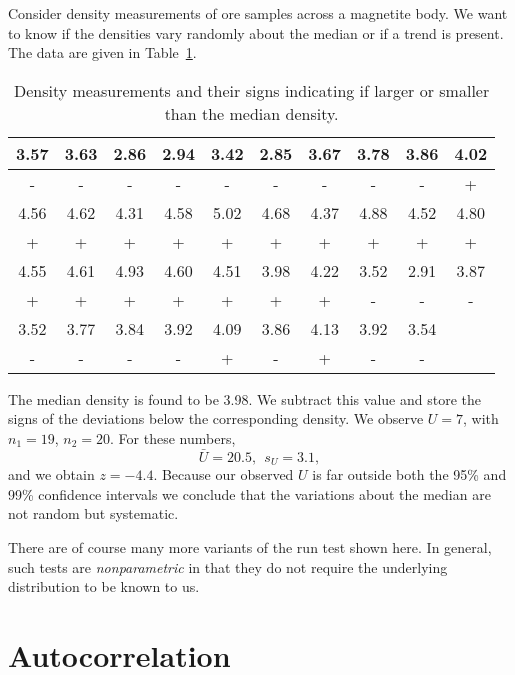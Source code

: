 \begin{example}
Consider density measurements of ore samples across a magnetite body.  We 
want to know if the densities vary randomly about the median or if a trend is present.  The data 
are given in Table~\ref{tbl:runtest}.
\begin{table}[h]
\center
\begin{tabular}{|c|c|c|c|c|c|c|c|c|c|} \hline
3.57 & 3.63 & 2.86 & 2.94 & 3.42 & 2.85 & 3.67 & 3.78 & 3.86 & 4.02 \\ \hline
 -   &  -   &  -   &  -   &  -   &  -   &  -   &  -   &  -   &  +   \\ \hline
4.56 & 4.62 & 4.31 & 4.58 & 5.02 & 4.68 & 4.37 & 4.88 & 4.52 & 4.80 \\ \hline
 +   &  +   &  +   &  +   &  +   &  +   &  +   &  +   &  +   &  +   \\ \hline
4.55 & 4.61 & 4.93 & 4.60 & 4.51 & 3.98 & 4.22 & 3.52 & 2.91 & 3.87 \\ \hline
 +   &  +   &  +   &  +   &  +   &  +   &  +   &  -   &  -   &  -   \\ \hline
3.52 & 3.77 & 3.84 & 3.92 & 4.09 & 3.86 & 4.13 & 3.92 & 3.54 &      \\ \hline
 -   &  -   &  -   &  -   &  +   &  -   &  +   &  -   &  -   &      \\ \hline
\end{tabular}
\caption{Density measurements and their signs indicating if larger or smaller than the median density.}
\label{tbl:runtest}
\end{table}
The median density is found to be 3.98.  We subtract this value and store the signs of the 
deviations below the corresponding density.  We observe $U = 7$, with $n_1 = 19$, $n_2 = 20$.  For these numbers, 
\begin{equation}
\bar{U} = 20.5, \ \ s_U = 3.1,
\end{equation}
and we obtain $z = -4.4$.  Because our observed $U$ is far outside both the 95\% and 99\% confidence intervals we conclude 
that the variations about the median are not random but systematic.
\end{example}
There are of course many 
more variants of the run test shown here.  In general, such tests are \emph{nonparametric} in that they 
do not require the underlying distribution to be known to us.

\section{Autocorrelation}

